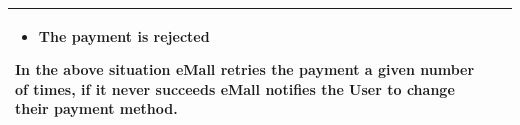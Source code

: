 \documentclass[11pt]{article}
\begin{document}
\begin{description}
\begin{table}[H]
\begin{tabularx}{\textwidth}{|>{\hsize=0.5\hsize}X|>{\hsize=1.5\hsize}X|}
\begin{minipage}[t]{\hsize}
                \begin{itemize}[topsep=0pt, leftmargin=*]
                    \item The payment is rejected
                \end{itemize}
                \vspace{8pt}
                \end{minipage}
                In the above situation eMall retries the payment a given number of times, if it never succeeds eMall notifies the User to change their payment method.
                \vspace{6pt}
            \\
            \hline
        \end{tabularx}
    \end{table}
    
    \newpage
    

\end{description}
\end{document}
